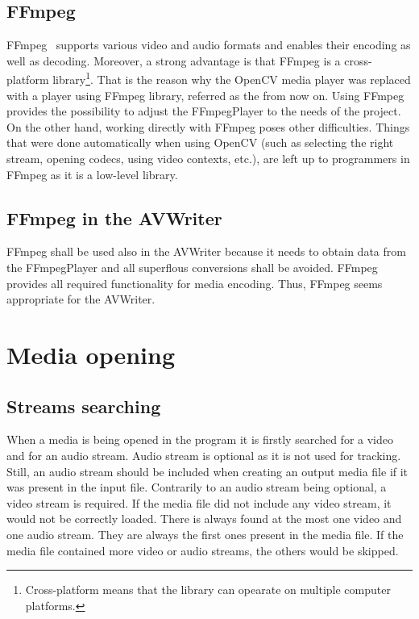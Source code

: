 \subsection{FFmpeg}
FFmpeg~\cite{ffmpeg_basics} supports various video and audio formats and enables their encoding as well as decoding. Moreover, a strong advantage is that FFmpeg is a cross-platform library\footnote{Cross-platform means that the library can opearate on multiple computer platforms.}. That is the reason why the OpenCV media player was replaced with a player using FFmpeg library, referred as the  from now on. Using FFmpeg provides the possibility to adjust the FFmpegPlayer to the needs of the project. On the other hand, working directly with FFmpeg poses other difficulties. Things that were done automatically when using OpenCV (such as selecting the right stream, opening codecs, using video contexts, etc.), are left up to programmers in FFmpeg as it is a low-level library.

\subsection{FFmpeg in the AVWriter}
FFmpeg shall be used also in the AVWriter because it needs to obtain data from the FFmpegPlayer and all superflous conversions shall be avoided. FFmpeg provides all required functionality for media encoding. Thus, FFmpeg seems appropriate for the AVWriter.

\section{Media opening}
\subsection{Streams searching}
When a media is being opened in the program it is firstly searched for a video and for an audio stream. Audio stream is optional as it is not used for tracking. Still, an audio stream should be included when creating an output media file if it was present in the input file. Contrarily to an audio stream being optional, a video stream is required. If the media file did not include any video stream, it would not be correctly loaded. There is always found at the most one video and one audio stream. They are always the first ones present in the media file. If the media file contained more video or audio streams, the others would be skipped.

